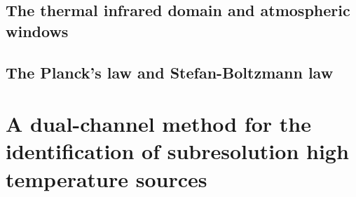 \subsection{The thermal infrared  domain and atmospheric windows}


\subsection{The Planck's law and Stefan-Boltzmann law}


\section{A dual-channel method for the identification of subresolution high temperature sources}


